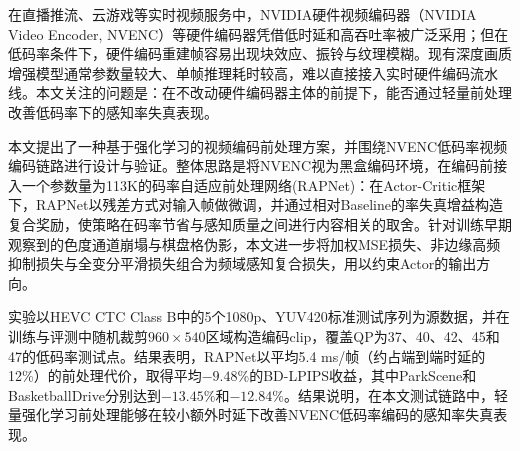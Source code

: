 
在直播推流、云游戏等实时视频服务中，NVIDIA硬件视频编码器（NVIDIA Video Encoder, NVENC）等硬件编码器凭借低时延和高吞吐率被广泛采用；但在低码率条件下，硬件编码重建帧容易出现块效应、振铃与纹理模糊。现有深度画质增强模型通常参数量较大、单帧推理耗时较高，难以直接接入实时硬件编码流水线。本文关注的问题是：在不改动硬件编码器主体的前提下，能否通过轻量前处理改善低码率下的感知率失真表现。

本文提出了一种基于强化学习的视频编码前处理方案，并围绕NVENC低码率视频编码链路进行设计与验证。整体思路是将NVENC视为黑盒编码环境，在编码前接入一个参数量为113K的码率自适应前处理网络(RAPNet)：在Actor-Critic框架下，RAPNet以残差方式对输入帧做微调，并通过相对Baseline的率失真增益构造复合奖励，使策略在码率节省与感知质量之间进行内容相关的取舍。针对训练早期观察到的色度通道崩塌与棋盘格伪影，本文进一步将加权MSE损失、非边缘高频抑制损失与全变分平滑损失组合为频域感知复合损失，用以约束Actor的输出方向。

实验以HEVC CTC Class B中的5个1080p、YUV420标准测试序列为源数据，并在训练与评测中随机裁剪$960\times540$区域构造编码clip，覆盖QP为37、40、42、45和47的低码率测试点。结果表明，RAPNet以平均5.4 ms/帧（约占端到端时延的12\%）的前处理代价，取得平均$-9.48\%$的BD-LPIPS收益，其中ParkScene和BasketballDrive分别达到$-13.45\%$和$-12.84\%$。结果说明，在本文测试链路中，轻量强化学习前处理能够在较小额外时延下改善NVENC低码率编码的感知率失真表现。

